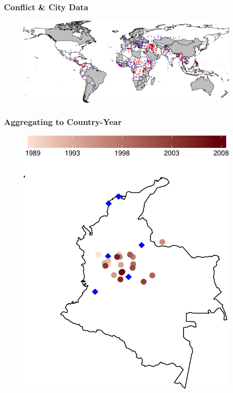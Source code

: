 \begin{frame}
\frametitle{Conflict \& City Data}

\vspace{-0.25cm}
\begin{figure}[ht]
  \centering
  \includegraphics[width=1\textwidth]{CityConfMap-crop}
\end{figure}

\end{frame}

\begin{frame}
\frametitle{Aggregating to Country-Year}

\begin{figure}[ht]
	\centering
	\includegraphics[width=.6\textwidth]{colombiaMap-crop}
\end{figure}

\end{frame}

